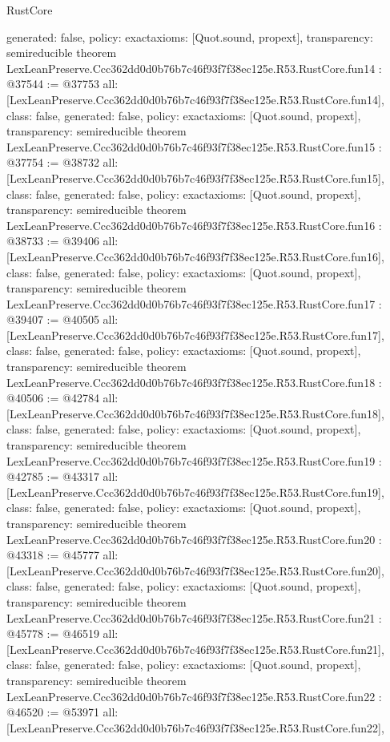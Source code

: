 \begin{lexlean}{RustCore}
\begin{coremodule}
{  generated: false,
  policy: exact{axioms: [Quot.sound, propext]},
  transparency: semireducible
}
theorem LexLeanPreserve.Ccc362dd0d0b76b7c46f93f7f38ec125e.R53.RustCore.fun14 : @37544 := @37753 {
  all: [LexLeanPreserve.Ccc362dd0d0b76b7c46f93f7f38ec125e.R53.RustCore.fun14],
  class: false,
  generated: false,
  policy: exact{axioms: [Quot.sound, propext]},
  transparency: semireducible
}
theorem LexLeanPreserve.Ccc362dd0d0b76b7c46f93f7f38ec125e.R53.RustCore.fun15 : @37754 := @38732 {
  all: [LexLeanPreserve.Ccc362dd0d0b76b7c46f93f7f38ec125e.R53.RustCore.fun15],
  class: false,
  generated: false,
  policy: exact{axioms: [Quot.sound, propext]},
  transparency: semireducible
}
theorem LexLeanPreserve.Ccc362dd0d0b76b7c46f93f7f38ec125e.R53.RustCore.fun16 : @38733 := @39406 {
  all: [LexLeanPreserve.Ccc362dd0d0b76b7c46f93f7f38ec125e.R53.RustCore.fun16],
  class: false,
  generated: false,
  policy: exact{axioms: [Quot.sound, propext]},
  transparency: semireducible
}
theorem LexLeanPreserve.Ccc362dd0d0b76b7c46f93f7f38ec125e.R53.RustCore.fun17 : @39407 := @40505 {
  all: [LexLeanPreserve.Ccc362dd0d0b76b7c46f93f7f38ec125e.R53.RustCore.fun17],
  class: false,
  generated: false,
  policy: exact{axioms: [Quot.sound, propext]},
  transparency: semireducible
}
theorem LexLeanPreserve.Ccc362dd0d0b76b7c46f93f7f38ec125e.R53.RustCore.fun18 : @40506 := @42784 {
  all: [LexLeanPreserve.Ccc362dd0d0b76b7c46f93f7f38ec125e.R53.RustCore.fun18],
  class: false,
  generated: false,
  policy: exact{axioms: [Quot.sound, propext]},
  transparency: semireducible
}
theorem LexLeanPreserve.Ccc362dd0d0b76b7c46f93f7f38ec125e.R53.RustCore.fun19 : @42785 := @43317 {
  all: [LexLeanPreserve.Ccc362dd0d0b76b7c46f93f7f38ec125e.R53.RustCore.fun19],
  class: false,
  generated: false,
  policy: exact{axioms: [Quot.sound, propext]},
  transparency: semireducible
}
theorem LexLeanPreserve.Ccc362dd0d0b76b7c46f93f7f38ec125e.R53.RustCore.fun20 : @43318 := @45777 {
  all: [LexLeanPreserve.Ccc362dd0d0b76b7c46f93f7f38ec125e.R53.RustCore.fun20],
  class: false,
  generated: false,
  policy: exact{axioms: [Quot.sound, propext]},
  transparency: semireducible
}
theorem LexLeanPreserve.Ccc362dd0d0b76b7c46f93f7f38ec125e.R53.RustCore.fun21 : @45778 := @46519 {
  all: [LexLeanPreserve.Ccc362dd0d0b76b7c46f93f7f38ec125e.R53.RustCore.fun21],
  class: false,
  generated: false,
  policy: exact{axioms: [Quot.sound, propext]},
  transparency: semireducible
}
theorem LexLeanPreserve.Ccc362dd0d0b76b7c46f93f7f38ec125e.R53.RustCore.fun22 : @46520 := @53971 {
  all: [LexLeanPreserve.Ccc362dd0d0b76b7c46f93f7f38ec125e.R53.RustCore.fun22],
}
\end{coremodule}
\end{lexlean}
